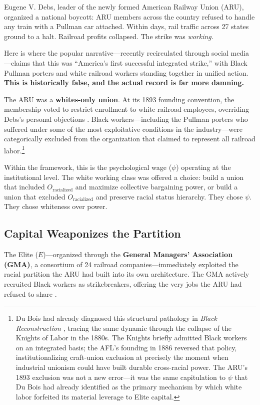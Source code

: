 Eugene V. Debs, leader of the newly formed American Railway Union (ARU), organized a national boycott: ARU members across the country refused to handle any train with a Pullman car attached. Within days, rail traffic across 27 states ground to a halt. Railroad profits collapsed. The strike was \textit{working}.

Here is where the popular narrative---recently recirculated through social media---claims that this was ``America's first successful integrated strike,'' with Black Pullman porters and white railroad workers standing together in unified action. \textbf{This is historically false, and the actual record is far more damning.}

The ARU was a \textbf{whites-only union}. At its 1893 founding convention, the membership voted to restrict enrollment to white railroad employees, overriding Debs's personal objections \cite{salvatore_debs, arnesen_waterfront}. Black workers---including the Pullman porters who suffered under some of the most exploitative conditions in the industry---were categorically excluded from the organization that claimed to represent all railroad labor.\footnote{Du Bois had already diagnosed this structural pathology in \textit{Black Reconstruction} \cite{dubois}, tracing the same dynamic through the collapse of the Knights of Labor in the 1880s. The Knights briefly admitted Black workers on an integrated basis; the AFL's founding in 1886 reversed that policy, institutionalizing craft-union exclusion at precisely the moment when industrial unionism could have built durable cross-racial power. The ARU's 1893 exclusion was not a new error---it was the same capitulation to $\psi$ that Du Bois had already identified as the primary mechanism by which white labor forfeited its material leverage to Elite capital.}

Within the framework, this is the psychological wage ($\psi$) operating at the institutional level. The white working class was offered a choice: build a union that included $O_{\text{racialized}}$ and maximize collective bargaining power, or build a union that excluded $O_{\text{racialized}}$ and preserve racial status hierarchy. They chose $\psi$. They chose whiteness over power.

\subsection{Capital Weaponizes the Partition}

The Elite ($E$)---organized through the \textbf{General Managers' Association (GMA)}, a consortium of 24 railroad companies---immediately exploited the racial partition the ARU had built into its own architecture. The GMA actively recruited Black workers as strikebreakers, offering the very jobs the ARU had refused to share \cite{arnesen_waterfront, lindsey_pullman}.

